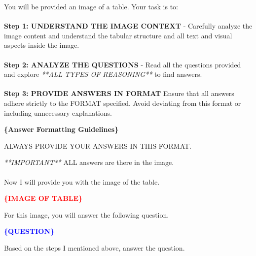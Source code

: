 \documentclass[11pt]{article}
\newcommand{\varred}[1]{\textcolor{red}{\textbf{#1}}}
\newcommand{\varblue}[1]{\textcolor{blue}{\textbf{#1}}}
\newcommand{\vargreen}[1]{\textcolor{olivegreen}{\textbf{#1}}}
\begin{document}
\begin{tcolorbox}[breakable,colback=lightestgray,colframe=black,title=\centering\textbf{Table as an Image Baseline Prompt}]
You will be provided an image of a table.
Your task is to:\\\\

\textbf{Step 1: UNDERSTAND THE IMAGE CONTEXT} -
Carefully analyze the image content and understand the tabular structure and all text and visual aspects inside the image.\\\\

\textbf{Step 2: ANALYZE THE QUESTIONS} -
Read all the questions provided and explore \textit{**ALL TYPES OF REASONING**} to find answers.\\\\

\textbf{Step 3: PROVIDE ANSWERS IN FORMAT
}Ensure that all answers adhere strictly to the FORMAT specified. Avoid deviating from this format or including unnecessary explanations.

\textbf{\vargreen{\{Answer Formatting Guidelines\}}}

ALWAYS PROVIDE YOUR ANSWERS IN THIS FORMAT.

\textit{**IMPORTANT**} ALL answers are there in the image.\\\\

Now I will provide you with the image of the table.

\textbf{\varred{\{IMAGE OF TABLE\}}}

For this image, you will answer the following question.

\textbf{\varblue{\{QUESTION\}}}

Based on the steps I mentioned above, answer the question.
\end{tcolorbox}
\end{document}
